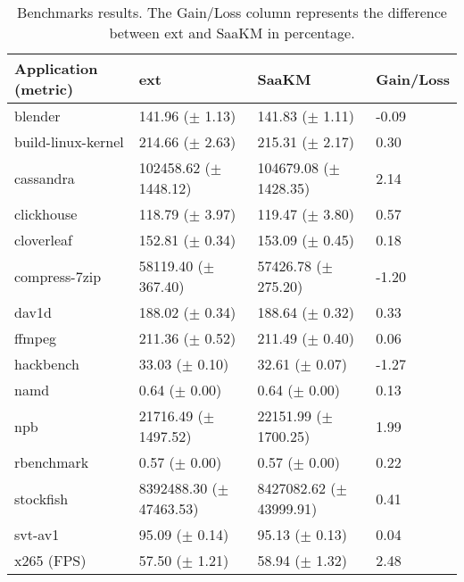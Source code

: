 
\begin{table*}[p]
        \centering
        \caption{Benchmarks results. The Gain/Loss column represents the difference between ext and SaaKM in percentage.}
        \label{tab:bench-res}
        \begin{tabular}{|l|l|l|l|}
        \hline
                Application (metric) &ext & SaaKM & Gain/Loss \\
                \hline
                blender & 141.96 ($\pm$ 1.13) & 141.83 ($\pm$ 1.11) & -0.09 \\
                build-linux-kernel & 214.66 ($\pm$ 2.63) & 215.31 ($\pm$ 2.17) & 0.30 \\
                cassandra & 102458.62 ($\pm$ 1448.12) & 104679.08 ($\pm$ 1428.35) & 2.14 \\
                clickhouse & 118.79 ($\pm$ 3.97) & 119.47 ($\pm$ 3.80) & 0.57 \\
                cloverleaf & 152.81 ($\pm$ 0.34) & 153.09 ($\pm$ 0.45) & 0.18 \\
                compress-7zip & 58119.40 ($\pm$ 367.40) & 57426.78 ($\pm$ 275.20) & -1.20 \\
                dav1d & 188.02 ($\pm$ 0.34) & 188.64 ($\pm$ 0.32) & 0.33 \\
                ffmpeg & 211.36 ($\pm$ 0.52) & 211.49 ($\pm$ 0.40) & 0.06 \\
                hackbench & 33.03 ($\pm$ 0.10) & 32.61 ($\pm$ 0.07) & -1.27 \\
                namd & 0.64 ($\pm$ 0.00) & 0.64 ($\pm$ 0.00) & 0.13 \\
                npb & 21716.49 ($\pm$ 1497.52) & 22151.99 ($\pm$ 1700.25) & 1.99 \\
                rbenchmark & 0.57 ($\pm$ 0.00) & 0.57 ($\pm$ 0.00) & 0.22 \\
                stockfish & 8392488.30 ($\pm$ 47463.53) & 8427082.62 ($\pm$ 43999.91) & 0.41 \\
                svt-av1 & 95.09 ($\pm$ 0.14) & 95.13 ($\pm$ 0.13) & 0.04 \\
                x265 (FPS) & 57.50 ($\pm$ 1.21) & 58.94 ($\pm$ 1.32) & 2.48 \\
                \hline
        
        \end{tabular}
\end{table*}
